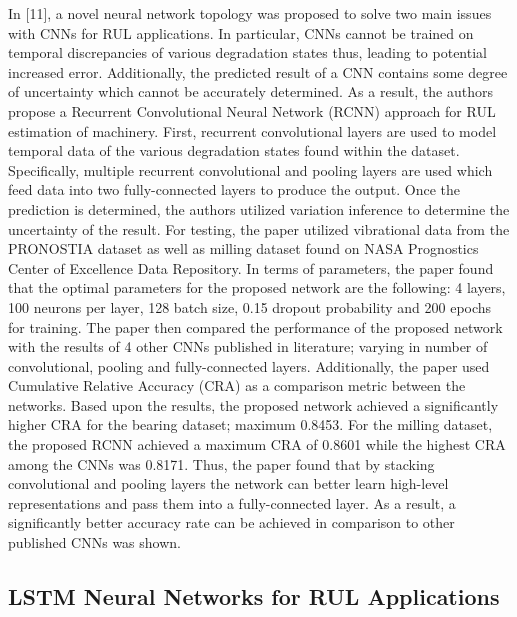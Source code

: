 \documentclass[journal]{IEEEtran}
\begin{document}
In [11], a novel neural network topology was proposed to solve two main issues with CNNs for RUL applications. In particular, CNNs cannot be trained on temporal discrepancies of various degradation states thus, leading to potential increased error. Additionally, the predicted result of a CNN contains some degree of uncertainty which cannot be accurately determined. As a result, the authors propose a Recurrent Convolutional Neural Network (RCNN) approach for RUL estimation of machinery. First, recurrent convolutional layers are used to model temporal data of the various degradation states found within the dataset. Specifically, multiple recurrent convolutional and pooling layers are used which feed data into two fully-connected layers to produce the output. Once the prediction is determined, the authors utilized variation inference to determine the uncertainty of the result. For testing, the paper utilized vibrational data from the PRONOSTIA dataset as well as milling dataset found on NASA Prognostics Center of Excellence Data Repository. In terms of parameters, the paper found that the optimal parameters for the proposed network are the following: 4 layers, 100 neurons per layer, 128 batch size, 0.15 dropout probability and 200 epochs for training. The paper then compared the performance of the proposed network with the results of 4 other CNNs published in literature; varying in number of convolutional, pooling and fully-connected layers. Additionally, the paper used Cumulative Relative Accuracy (CRA) as a comparison metric between the networks. Based upon the results, the proposed network achieved a significantly higher CRA for the bearing dataset; maximum 0.8453. For the milling dataset, the proposed RCNN achieved a maximum CRA of 0.8601 while the highest CRA among the CNNs was 0.8171. Thus, the paper found that by stacking convolutional and pooling layers the network can better learn high-level representations and pass them into a fully-connected layer. As a result, a significantly better accuracy rate can be achieved in comparison to other published CNNs was shown. 



\subsection{LSTM Neural Networks for RUL Applications}
\end{document}
